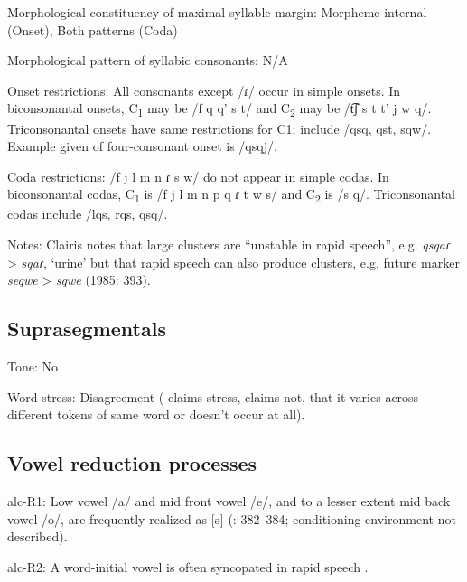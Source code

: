 {\begin{appendixdesc}
\item[Morphological constituency of maximal syllable margin:] Morpheme-internal (Onset), Both patterns (Coda)

\item[Morphological pattern of syllabic consonants:] N/A

\item[Onset restrictions:] All consonants except /ɾ/ occur in simple onsets. In biconsonantal onsets, C\textsubscript{1} may be /f q q' s t/ and C\textsubscript{2} may be /t͡ʃ s t t' j w q/. Triconsonantal onsets have same restrictions for C1; include /qsq, qst, sqw/. Example given of four-consonant onset is /qsqj/.

\item[Coda restrictions:] /f j l m n ɾ s w/ do not appear in simple codas. In biconsonantal codas, C\textsubscript{1} is /f j l m n p q ɾ t w s/ and C\textsubscript{2} is /s q/. Triconsonantal codas include /lqs, rqs, qsq/.

\item[Notes:] Clairis notes that large clusters are “unstable in rapid speech”, e.g. \textit{qsqaɾ} > \textit{sqaɾ}, ‘urine’ but that rapid speech can also produce clusters, e.g. future marker \textit{seqwe} > \textit{sqwe} (1985: 393).
\end{appendixdesc}
\subsection*{Suprasegmentals}
\begin{appendixdesc}
\item[Tone:] No

\item[Word stress:] Disagreement (\citealt{Clairis1977} claims stress, \citealt{Clairis1985} claims not, that it varies across different tokens of same word or doesn’t occur at all).
\end{appendixdesc}
\subsection*{Vowel reduction processes}
\begin{appendixdesc}
\item[alc-R1:] Low vowel /a/ and mid front vowel /e/, and to a lesser extent mid back vowel /o/, are frequently realized as [ə] (\citealt{Clairis1985}: 382--384; conditioning environment not described).

\item[alc-R2:] A word-initial vowel is often syncopated in rapid speech \citep[393]{Clairis1985}.


\end{appendixdesc}}
